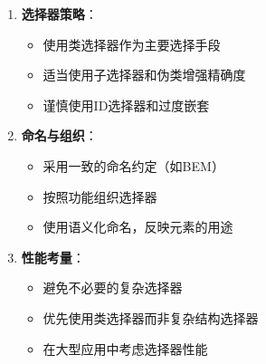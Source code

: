 \begin{enumerate}
\def\labelenumi{\arabic{enumi}.}
\tightlist
\item
  \textbf{选择器策略}：

  \begin{itemize}
  \tightlist
  \item
    使用类选择器作为主要选择手段
  \item
    适当使用子选择器和伪类增强精确度
  \item
    谨慎使用ID选择器和过度嵌套
  \end{itemize}
\item
  \textbf{命名与组织}：

  \begin{itemize}
  \tightlist
  \item
    采用一致的命名约定（如BEM）
  \item
    按照功能组织选择器
  \item
    使用语义化命名，反映元素的用途
  \end{itemize}
\item
  \textbf{性能考量}：

  \begin{itemize}
  \tightlist
  \item
    避免不必要的复杂选择器
  \item
    优先使用类选择器而非复杂结构选择器
  \item
    在大型应用中考虑选择器性能
  \end{itemize}
\end{enumerate}
